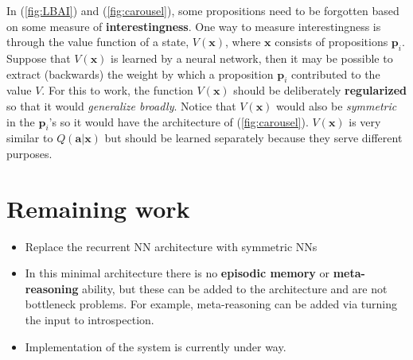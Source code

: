 \documentclass[orivec]{llncs}
\newcommand{\vect}[1]{\boldsymbol{#1}}
\begin{document}
In (\ref{fig:LBAI}) and (\ref{fig:carousel}), some propositions need to be forgotten based on some measure of \textbf{interestingness}.  One way to measure interestingness is through the value function of a state, $V(\vect{x})$, where $\vect{x}$ consists of propositions $\vect{p}_i$.  Suppose that $V(\vect{x})$ is learned by a neural network, then it may be possible to extract (backwards) the weight by which a proposition $\vect{p}_i$ contributed to the value $V$.  For this to work, the function $V(\vect{x})$ should be deliberately \textbf{regularized} so that it would \textit{generalize broadly}.  Notice that $V(\vect{x})$ would also be \textit{symmetric} in the $\vect{p}_i$'s  so it would have the architecture of (\ref{fig:carousel}).  $V(\vect{x})$ is very similar to $Q(\vect{a}|\vect{x})$ but should be learned separately because they serve different purposes.




\section{Remaining work}


\begin{itemize}
	\item Replace the recurrent NN architecture with symmetric NNs
	\item In this minimal architecture there is no \textbf{episodic memory} or \textbf{meta-reasoning} ability, but these can be added to the architecture and are not bottleneck problems.  For example, meta-reasoning can be added via turning the input to introspection.
	\item Implementation of the system is currently under way.
\end{itemize}
\end{document}
